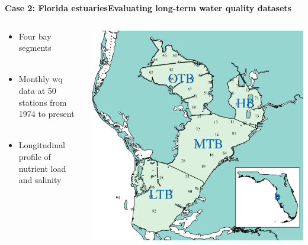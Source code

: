\documentclass[serif]{beamer}\usepackage[]{graphicx}\usepackage[]{color}
\begin{document}


\begin{frame}{\textbf{Case 2: Florida estuaries}}{\textbf{Evaluating long-term water quality datasets}}
\begin{columns}
\begin{column}{0.5\textwidth}
\begin{itemize}
\item Four bay segments\\~\\
\item Monthly wq data at 50 stations from 1974 to present \\~\\
\item Longitudinal profile of nutrient load and salinity \\~\\
\end{itemize}
\vspace{0cm}\hspace*{15pt}
\end{column}
\begin{column}{0.5\textwidth}
\centerline{\includegraphics[width = \textwidth]{fig/tb_map.pdf}}
\end{column}
\end{columns}
\end{frame}
\end{document}
